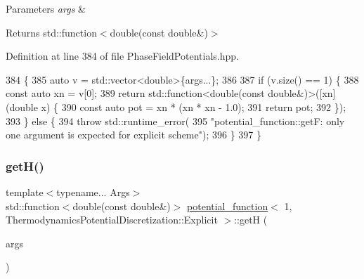 \begin{DoxyParams}{Parameters}
{\em args} & \\
\hline
\end{DoxyParams}
\begin{DoxyReturn}{Returns}
std\+::function$<$double(const double\&)$>$ 
\end{DoxyReturn}


Definition at line 384 of file Phase\+Field\+Potentials.\+hpp.


\begin{DoxyCode}
384                                                         \{
385     \textcolor{keyword}{auto} v = std::vector<double>\{args...\};
386 
387     \textcolor{keywordflow}{if} (v.size() == 1) \{
388       \textcolor{keyword}{const} \textcolor{keyword}{auto} xn = v[0];
389       \textcolor{keywordflow}{return} std::function<double(const double&)>([xn](\textcolor{keywordtype}{double} x) \{
390         \textcolor{keyword}{const} \textcolor{keyword}{auto} pot = xn * (xn * xn - 1.0);
391         \textcolor{keywordflow}{return} pot;
392       \});
393     \} \textcolor{keywordflow}{else} \{
394       \textcolor{keywordflow}{throw} std::runtime\_error(
395           \textcolor{stringliteral}{"potential\_function::getF: only one argument is expected for explicit scheme"});
396     \}
397   \}
\end{DoxyCode}
\mbox{\label{structpotential__function_3_011_00_01ThermodynamicsPotentialDiscretization_1_1Explicit_01_4_a7b08d20c38b06d405bc33d028ba6bad0}} 
\subsubsection{\texorpdfstring{get\+H()}{getH()}}
{\footnotesize\ttfamily template$<$typename... Args$>$ \\
std\+::function$<$double(const double\&)$>$ \hyperlink{structpotential__function}{potential\+\_\+function}$<$ 1, Thermodynamics\+Potential\+Discretization\+::\+Explicit $>$\+::getH (\begin{DoxyParamCaption}\item[{Args...}]{args }\end{DoxyParamCaption})\hspace{0.3cm}{\ttfamily [inline]}}



